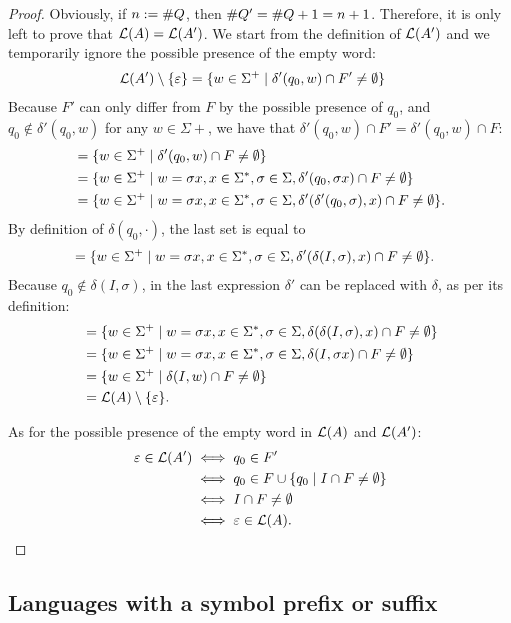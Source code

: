 \begin{proof}
	Obviously, if $n:=\# Q$, then $\# Q'=\# Q+1=n+1$. Therefore, it is only left to prove that $\mathcal L(A)=\mathcal L(A')$.
	We start from the definition of $\mathcal L(A')$ and we temporarily ignore the possible presence of the empty word:
	\begin{align*}
		\mathcal L(A')\setminus\{\varepsilon\} & = \{w\in\Sigma^+\mid \delta'(q_0,w)\cap F'\ne\emptyset\}
	\end{align*}
	Because $F'$ can only differ from $F$ by the possible presence of $q_0$, and $q_0\notin\delta'(q_0,w)$ for any $w\in\Sigma\plus$, we have that $\delta'(q_0,w)\cap F'=\delta'(q_0,w)\cap F$:
	\begin{align*}
		 & = \{w\in\Sigma^+\mid \delta'(q_0,w)\cap F\ne\emptyset\}                                                                    \\
		 & = \{w\in\Sigma^+\mid w=\sigma x, x\in\Sigma^*,\sigma\in\Sigma,\delta'(q_0,\sigma x)\cap F\ne\emptyset\}                 \\
		 & = \{w\in\Sigma^+\mid w=\sigma x, x\in\Sigma^*,\sigma\in\Sigma,\delta'(\delta'(q_0,\sigma),x)\cap F\ne\emptyset\} \text.
	\end{align*}
	By definition of $\delta(q_0,\cdot)$, the last set is equal to
	\begin{align*}
		 & = \{w\in\Sigma^+\mid w=\sigma x, x\in\Sigma^*,\sigma\in\Sigma,\delta'(\delta(I,\sigma),x)\cap F\ne\emptyset\} \text.
	\end{align*}
	Because $q_0\notin\delta(I,\sigma)$, in the last expression $\delta'$ can be replaced with $\delta$, as per its definition:
	\begin{align*}
		 & = \{w\in\Sigma^+\mid w=\sigma x, x\in\Sigma^*,\sigma\in\Sigma,\delta(\delta(I,\sigma),x)\cap F\ne\emptyset\} \\
		 & = \{w\in\Sigma^+\mid w=\sigma x, x\in\Sigma^*,\sigma\in\Sigma,\delta(I,\sigma x)\cap F\ne\emptyset\}         \\
		 & = \{w\in\Sigma^+\mid \delta(I,w)\cap F\ne\emptyset\}                                                            \\
		 & = \mathcal L(A)\setminus\{\varepsilon\} \text.
	\end{align*}

	As for the possible presence of the empty word in $\mathcal L(A)$ and $\mathcal L(A')$:
	\begin{align*}
		\varepsilon\in\mathcal L(A') & \iff q_0\in F'                                     \\
		                          & \iff q_0\in F\cup\{q_0\mid I\cap F\ne\emptyset\} \\
		                          & \iff I\cap F\ne\emptyset                           \\
		                          & \iff \varepsilon\in\mathcal L(A) \text. \qedhere
	\end{align*}
\end{proof}


\subsection{Languages with a symbol prefix or suffix}
